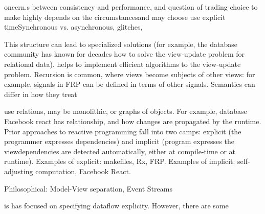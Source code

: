 \hidden
{
oncern.s between consistency and performance, and question of trading  choice to make highly depends on the circumstancesand may choose use explicit timeSynchronous vs. asynchronous, glitches, 
 
This structure can lead to specialized solutions (for example, the database community has known for decades how to solve the view-update problem for relational data). helps to implement efficient algorithms  to the view-update problem. Recursion is common, where views become subjects of other views: for example, signals in FRP can be defined in terms of other signals. Semantics can differ in how they treat 


use relations, may be monolithic, or graphs of objects. For example, database Facebook react has 
relationship, and how changes are propagated by the runtime. Prior approaches to reactive programming fall into two camps: explicit (the programmer expresses dependencies) and implicit (program expresses the viewdependencies are detected automatically, either at compile-time or at runtime).
Examples of explicit: makefiles, Rx, FRP. Examples of implicit: self-adjusting computation, Facebook React.

Philosophical: Model-View separation, Event Streams

  is has focused on specifying dataflow explicity. However, there are some 
}

